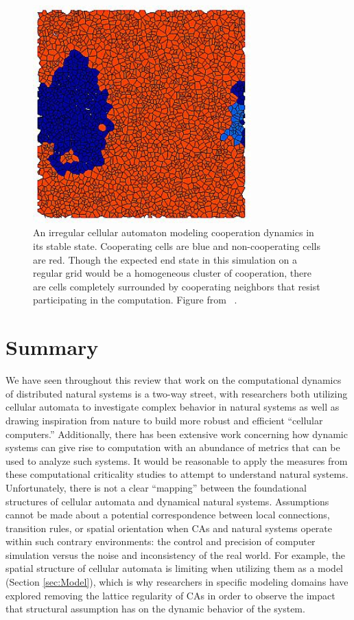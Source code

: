 \documentclass[a4paper,11pt]{report}
\begin{document}
\begin{figure}[htp]
\centering
\includegraphics[width=0.75\textwidth]{fl01_fig9_color.jpg}
\caption[``Dead Cells'' in Voronoi CA]{
An irregular cellular automaton modeling cooperation dynamics in its stable state. Cooperating cells are blue and non-cooperating cells are red. Though the expected end state in this simulation on a regular grid would be a homogeneous cluster of cooperation, there are cells completely surrounded by cooperating neighbors that resist participating in the computation. Figure from \citeauthor{fl01}~\cite{fl01}.
}
\label{fig:dead_cells}
\end{figure}

\section{Summary}
\label{sec:PrevSum} 

We have seen throughout this review that work on the computational dynamics of distributed natural systems is a two-way street, 
with researchers both utilizing cellular automata to investigate complex behavior in natural systems as well as drawing inspiration from nature to build more robust and efficient ``cellular computers.'' Additionally, there has been extensive work concerning how dynamic systems can give rise to computation with an abundance of metrics that can be used to analyze such systems. It would be reasonable to apply the measures from these computational criticality studies to attempt to understand natural systems. Unfortunately, there is not a clear ``mapping'' between the foundational structures of cellular automata and dynamical natural systems. Assumptions cannot be made about a potential correspondence between local connections, transition rules, or spatial orientation when CAs and natural systems operate within such contrary environments: the control and precision of computer simulation versus the noise and inconsistency of the real world. For example, the spatial structure of cellular automata is limiting when utilizing them as a model (Section \ref{sec:Model}), which is why researchers in specific modeling domains have explored removing the lattice regularity of CAs in order to observe the impact that structural assumption has on the dynamic behavior of the system.
\end{document}
